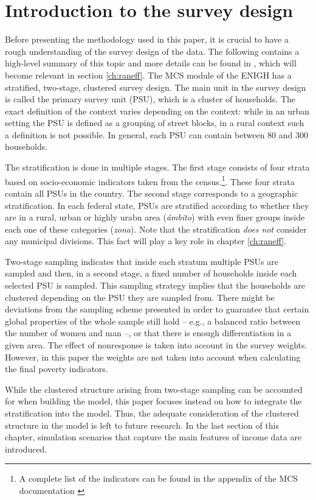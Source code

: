 \section{Introduction to the survey design}
\label{ch:design}

Before presenting the methodology used in this paper, it is crucial to have a rough understanding of the survey design of the data.
The following contains a high-level summary of this topic and more details can be found in \cite{inegi_modulo_2011}, which will become relevant in section \ref{ch:raneff}.
The MCS module of the ENIGH has a stratified, two-stage, clustered survey design.
The main unit in the survey design is called the primary survey unit (PSU), which is a cluster of households.
The exact definition of the context varies depending on the context:
while in an urban setting the PSU is defined as a grouping of street blocks, in a rural context such a definition is not possible.
In general, each PSU can contain between 80 and 300 households.

The stratification is done in multiple stages.
The first stage consists of four strata based on socio-economic indicators taken from the census.\footnote{A complete list of the indicators can be found in the appendix of the MCS documentation \citep{inegi_modulo_2011}}. These four strata contain all PSUs in the country.
The second stage corresponds to a geographic stratification.
In each federal state, PSUs are stratified according to whether they are in a rural, urban or highly urabn area (\textit{ámbito}) with even finer groups inside each one of these categories (\textit{zona}).
Note that the stratification \textit{does not} consider any municipal divisions.
This fact will play a key role in chapter \ref{ch:raneff}.

Two-stage sampling indicates that inside each stratum multiple PSUs are sampled and then, in a second stage, a fixed number of households inside each selected PSU is sampled.
This sampling strategy implies that the households are clustered depending on the PSU they are sampled from.
There might be deviations from the sampling scheme presented in order to guarantee that certain global properties of the whole sample still hold – e.g., a balanced ratio between the number of women and man –, or that there is enough differentiation in a given area.
The effect of nonresponse is taken into account in the survey weights.
However, in this paper the weights are not taken into account when calculating the final poverty indicators.

While the clustered structure arising from two-stage sampling can be accounted for when building the model, this paper focuses instead on how to integrate the stratification into the model.
Thus, the adequate consideration of the clustered structure in the model is left to future research.
In the last section of this chapter, simulation scenarios that capture the main features of income data are introduced.



